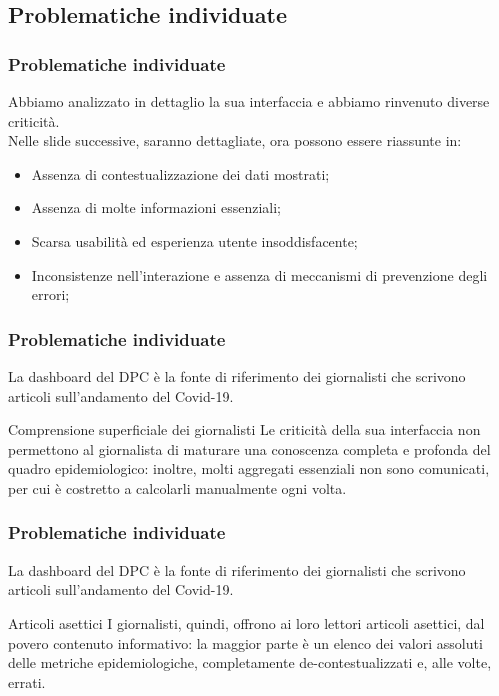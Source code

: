 \documentclass[../../main.tex]{subfiles}
\begin{document}
\subsection{Problematiche individuate}

\begin{frame}
    \frametitle{Problematiche individuate}
    Abbiamo analizzato in dettaglio la sua interfaccia e abbiamo rinvenuto diverse criticità.\\
    Nelle slide successive, saranno dettagliate, ora possono essere riassunte in:
    \begin{itemize}
        \item<1-> Assenza di contestualizzazione dei dati mostrati;
        \item<2-> Assenza di molte informazioni essenziali;
        \item<3-> Scarsa usabilità ed esperienza utente insoddisfacente;
        \item<4-> Inconsistenze nell'interazione e assenza di meccanismi di prevenzione degli errori;
    \end{itemize}

\end{frame}

\begin{frame}
    \frametitle{Problematiche individuate}
    La dashboard del DPC è la fonte di riferimento dei giornalisti che scrivono articoli sull'andamento del Covid-19.
    \vspace{-50pt}
    \begin{alertblock}{Comprensione superficiale dei giornalisti}
        Le criticità della sua interfaccia non permettono al giornalista di maturare una conoscenza completa e profonda del quadro epidemiologico: inoltre, molti aggregati essenziali non sono comunicati, per cui è costretto a calcolarli manualmente ogni volta.
    \end{alertblock}

\end{frame}

\begin{frame}
    \frametitle{Problematiche individuate}
    La dashboard del DPC è la fonte di riferimento dei giornalisti che scrivono articoli sull'andamento del Covid-19.
    \vspace{-50pt}
    \begin{alertblock}{Articoli asettici}
        I giornalisti, quindi, offrono ai loro lettori articoli asettici, dal povero contenuto informativo: la maggior parte è un elenco dei valori assoluti delle metriche epidemiologiche, completamente de-contestualizzati e, alle volte, errati.
    \end{alertblock}

\end{frame}
\end{document}
